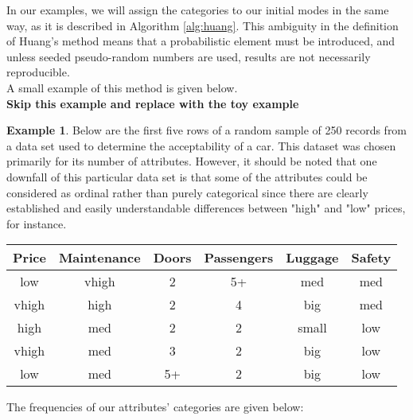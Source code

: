 \documentclass{article}
\theoremstyle{definition}
\newtheorem{example}{Example}
\begin{document}
In our examples, we will assign the categories to our initial modes in the same
way, as it is described in Algorithm \ref{alg:huang}. This ambiguity in the 
definition of Huang's method means that a probabilistic element must be 
introduced, and unless seeded pseudo-random numbers are used, results are not 
necessarily reproducible. \\

A small example of this method is given below. \\

{\textbf{\large{Skip this example and replace with the toy example}}}

\begin{example}	
	Below are the first five rows of a random sample of 250 records from a 
	data set used to determine the acceptability of a car. This dataset was
	chosen primarily for its number of attributes. However, it should be 
	noted that one downfall of this particular data set is that some of the
	attributes could be considered as ordinal rather than purely categorical
	since there are clearly established and easily understandable 
	differences between "high" and "low" prices, for instance. \\
	
	\begin{table}[H]
		\centering
			\begin{tabular}{c|c|c|c|c|c}\label{table:1}
			Price & Maintenance & Doors & Passengers & Luggage & Safety \\
			\hline
			low &               vhigh &            2 &                  5+ &              med &          med \\
        	vhigh &             high &            2 &                  4 &              big &          med \\
        	high &             med &            2 &                  2 &              small &          low \\          
        	vhigh &              med &            3 &                  2 &            big &          low \\         
        	low &             med &            5+ &                  2 &              big &           low \\
			\end{tabular}
	\end{table}
	
	The frequencies of our attributes' categories are given below: \\
	

\end{example}
\end{document}
